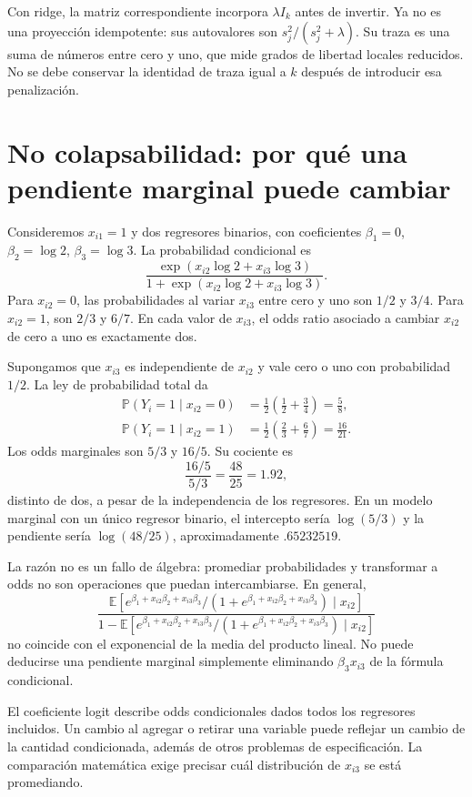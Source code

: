 \documentclass[11pt,a4paper]{article}
\newcommand{\E}{\mathbb E}
\newcommand{\Prob}{\mathbb P}
\begin{document}
Con ridge, la matriz correspondiente incorpora
\(\lambda I_k\) antes de invertir.
Ya no es una proyección idempotente:
sus autovalores son \(s_j^2/(s_j^2+\lambda)\).
Su traza es una suma de números entre cero y uno,
que mide grados de libertad locales reducidos.
No se debe conservar la identidad de traza igual a \(k\)
después de introducir esa penalización.

\clearpage
\section{No colapsabilidad: por qué una pendiente marginal puede cambiar}\label{logit79}
Consideremos \(x_{i1}=1\) y dos regresores binarios,
con coeficientes \(\beta_1=0\), \(\beta_2=\log2\),
\(\beta_3=\log3\). La probabilidad condicional es
\[
\frac{\exp(x_{i2}\log2+x_{i3}\log3)}
{1+\exp(x_{i2}\log2+x_{i3}\log3)}.
\]
Para \(x_{i2}=0\), las probabilidades al variar \(x_{i3}\)
entre cero y uno son \(1/2\) y \(3/4\).
Para \(x_{i2}=1\), son \(2/3\) y \(6/7\).
En cada valor de \(x_{i3}\), el odds ratio asociado a
cambiar \(x_{i2}\) de cero a uno es exactamente dos.

Supongamos que \(x_{i3}\) es independiente de \(x_{i2}\)
y vale cero o uno con probabilidad \(1/2\).
La ley de probabilidad total da
\[
\begin{aligned}
\Prob(Y_i=1\mid x_{i2}=0)&=\tfrac12(\tfrac12+\tfrac34)=\tfrac58,\\
\Prob(Y_i=1\mid x_{i2}=1)&=\tfrac12(\tfrac23+\tfrac67)=\tfrac{16}{21}.
\end{aligned}
\]
Los odds marginales son \(5/3\) y \(16/5\).
Su cociente es
\[
\frac{16/5}{5/3}=\frac{48}{25}=1.92,
\]
distinto de dos, a pesar de la independencia de los regresores.
En un modelo marginal con un único regresor binario,
el intercepto sería \(\log(5/3)\) y la pendiente
sería \(\log(48/25)\), aproximadamente \(.65232519\).

La razón no es un fallo de álgebra:
promediar probabilidades y transformar a odds
no son operaciones que puedan intercambiarse.
En general,
\[
\frac{\E\left[e^{\beta_1+x_{i2}\beta_2+x_{i3}\beta_3}/
(1+e^{\beta_1+x_{i2}\beta_2+x_{i3}\beta_3})\mid x_{i2}\right]}
{1-\E\left[e^{\beta_1+x_{i2}\beta_2+x_{i3}\beta_3}/
(1+e^{\beta_1+x_{i2}\beta_2+x_{i3}\beta_3})\mid x_{i2}\right]}
\]
no coincide con el exponencial de la media del producto lineal.
No puede deducirse una pendiente marginal simplemente
eliminando \(\beta_3x_{i3}\) de la fórmula condicional.

El coeficiente logit describe odds condicionales
dados todos los regresores incluidos.
Un cambio al agregar o retirar una variable puede reflejar
un cambio de la cantidad condicionada, además de otros
problemas de especificación.
La comparación matemática exige precisar cuál
distribución de \(x_{i3}\) se está promediando.
\end{document}
